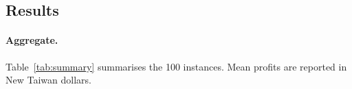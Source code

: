 \documentclass[a4paper,12pt]{article}
\begin{document}
\subsection*{Results}

\paragraph{Aggregate.}
Table~\ref{tab:summary} summarises the 100 instances. Mean profits are
reported in New Taiwan dollars.

\begin{table}[H]
\centering\small

\caption{Mean profit, optimal-match count, and mean relative gap over 25 instances per scenario. ``Opt-match'' counts the instances on which the heuristic's profit equals the MILP's optimal profit.}
\label{tab:summary}
\end{table}
\end{document}
